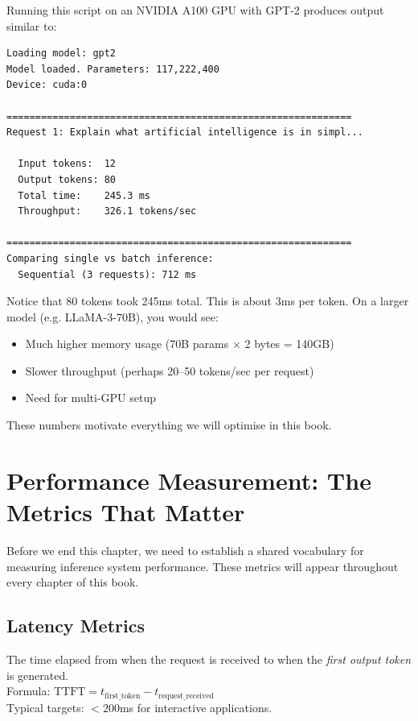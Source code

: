 \documentclass[12pt, twoside, openright]{book}
\begin{document}
Running this script on an NVIDIA A100 GPU with GPT-2 produces output
similar to:

\begin{lstlisting}[style=bashstyle,
  caption={Sample output from basic inference script}]
Loading model: gpt2
Model loaded. Parameters: 117,222,400
Device: cuda:0

============================================================
Request 1: Explain what artificial intelligence is in simpl...

  Input tokens:  12
  Output tokens: 80
  Total time:    245.3 ms
  Throughput:    326.1 tokens/sec

============================================================
Comparing single vs batch inference:
  Sequential (3 requests): 712 ms
\end{lstlisting}

\begin{notebox}
Notice that 80 tokens took 245ms total. This is about 3ms per token.
On a larger model (e.g. LLaMA-3-70B), you would see:
\begin{itemize}
  \item Much higher memory usage (70B params $\times$ 2 bytes = 140GB)
  \item Slower throughput (perhaps 20--50 tokens/sec per request)
  \item Need for multi-GPU setup
\end{itemize}
These numbers motivate everything we will optimise in this book.
\end{notebox}

\section{Performance Measurement: The Metrics That Matter}

Before we end this chapter, we need to establish a shared vocabulary
for measuring inference system performance.
These metrics will appear throughout every chapter of this book.

\subsection{Latency Metrics}

\begin{defbox}
The time elapsed from when the request is received to when the
\textit{first output token} is generated.\\[4pt]
Formula: $\text{TTFT} = t_{\text{first\_token}} - t_{\text{request\_received}}$\\[4pt]
Typical targets: $<200$ms for interactive applications.
\end{defbox}
\end{document}
